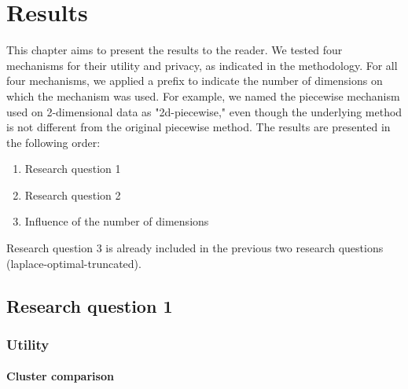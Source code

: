 \chapter{Results}
This chapter aims to present the results to the reader.
We tested four mechanisms for their utility and privacy, as indicated in the methodology.
For all four mechanisms, we applied a prefix to indicate the number of dimensions on which the mechanism was used.
For example, we named the piecewise mechanism used on 2-dimensional data as "2d-piecewise," even though the underlying method is not different from the original piecewise method.
The results are presented in the following order:
\begin{enumerate}
    \item Research question 1
    \item Research question 2
    \item Influence of the number of dimensions
\end{enumerate}
Research question 3 is already included in the previous two research questions (laplace-optimal-truncated).
\newpage
\section{Research question 1}

\subsection{Utility}
\subsubsection*{Cluster comparison}
